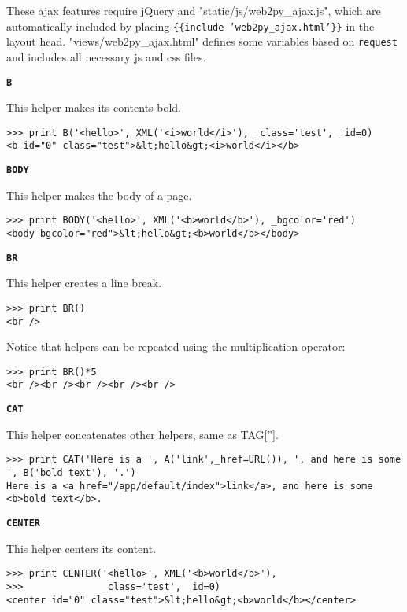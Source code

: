 \documentclass[justified,sixbynine,notoc]{tufte-book}
\def\ft{\small\tt}
\def\inxx#1{\index{#1}}
\begin{document}
\begin{fullwidth}
These ajax features require jQuery and "static/js/web2py\_ajax.js", which are automatically included by placing {\ft \{\{include 'web2py\_ajax.html'\}\}} in the layout head. "views/web2py\_ajax.html" defines some variables based on {\ft request} and includes all necessary js and css files.

{\bf {\ft B}}

\inxx{B}

This helper makes its contents bold.
\begin{lstlisting}
>>> print B('<hello>', XML('<i>world</i>'), _class='test', _id=0)
<b id="0" class="test">&lt;hello&gt;<i>world</i></b>
\end{lstlisting}

{\bf {\ft BODY}}

\inxx{BODY}
This helper makes the body of a page.
\begin{lstlisting}
>>> print BODY('<hello>', XML('<b>world</b>'), _bgcolor='red')
<body bgcolor="red">&lt;hello&gt;<b>world</b></body>
\end{lstlisting}

{\bf {\ft BR}}

\inxx{BR}

This helper creates a line break.
\begin{lstlisting}
>>> print BR()
<br />
\end{lstlisting}

Notice that helpers can be repeated using the multiplication operator:

\begin{lstlisting}
>>> print BR()*5
<br /><br /><br /><br /><br />
\end{lstlisting}

{\bf {\ft CAT}}

\inxx{CAT}

This helper concatenates other helpers, same as TAG[''].
\begin{lstlisting}
>>> print CAT('Here is a ', A('link',_href=URL()), ', and here is some ', B('bold text'), '.')
Here is a <a href="/app/default/index">link</a>, and here is some <b>bold text</b>.
\end{lstlisting}

{\bf {\ft CENTER}}

\inxx{CENTER}

This helper centers its content.
\begin{lstlisting}
>>> print CENTER('<hello>', XML('<b>world</b>'),
>>>              _class='test', _id=0)
<center id="0" class="test">&lt;hello&gt;<b>world</b></center>
\end{lstlisting}


\end{fullwidth}
\end{document}
